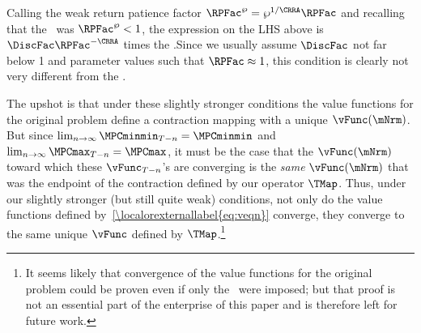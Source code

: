 \documentclass[\econtexRoot/BufferStockTheory]{subfiles}
\begin{document}
Calling the weak return patience factor $\RPFac^{\wp}=\wp^{1/\CRRA}\RPFac$ and recalling that the \WRIC~was $\RPFac^{\wp}<1$, the expression on the LHS above is $\DiscFac \RPFac^{-\CRRA}$ times the {\WRPFacDefn}.\@ Since we usually assume $\DiscFac$ not far below 1 and parameter values such that $\RPFac \approx 1$, this condition is clearly not very different from the \WRIC.\@

The upshot is that under these slightly stronger conditions the value functions for the original problem define a contraction mapping with a unique $\vFunc(\mNrm)$.  But since $\lim_{n \rightarrow \infty} \MPCminmin_{T-n} = \MPCminmin$ and $\lim_{n \rightarrow \infty} \MPCmax_{T-n} = \MPCmax$, it must be the case that the $\vFunc(\mNrm)$ toward which these $\vFunc_{T-n}$'s are converging is the \textit{same} $\vFunc(\mNrm)$ that was the endpoint of the contraction defined by our operator $\TMap$.  Thus, under our slightly stronger (but still quite weak) conditions, not only do the value functions defined by~\eqref{\localorexternallabel{eq:veqn}} converge, they converge to the same unique $\vFunc$ defined by $\TMap$.\footnote{It seems likely that convergence of the value functions for the original problem could be proven even if only the \WRIC~were imposed; but that proof is not an essential part of the enterprise of this paper and is therefore left for future work.}

\onlyinsubfile{\pagebreak}
\end{document}
